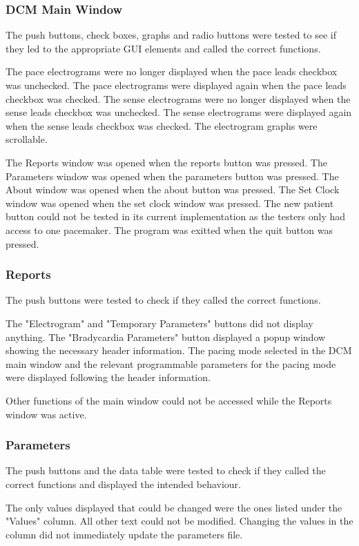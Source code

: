 \documentclass[12pt]{article}
\begin{document}
\subsubsection{DCM Main Window}\label{Testing:DCMMainWindow}
The push buttons, check boxes, graphs and radio buttons were tested to see if they led to the appropriate GUI elements and called the correct functions.

The pace electrograms were no longer displayed when the pace leads checkbox was unchecked. The pace electrograms were displayed again when the pace leads checkbox was checked. The sense electrograms were no longer displayed when the sense leads checkbox was unchecked. The sense electrograms were displayed again when the sense leads checkbox was checked. The electrogram graphs were scrollable.

The Reports window was opened when the reports button was pressed. The Parameters window was opened when the parameters button was pressed. The About window was opened when the about button was pressed. The Set Clock window was opened when the set clock window was pressed. The new patient button could not be tested in its current implementation as the testers only had access to one pacemaker. The program was exitted when the quit button was pressed.

\subsubsection{Reports}\label{Testing:Reports}
The push buttons were tested to check if they called the correct functions.

The "Electrogram" and "Temporary Parameters" buttons did not display anything. The "Bradycardia Parameters" button displayed a popup window showing the necessary header information. The pacing mode selected in the DCM main window and the relevant programmable parameters for the pacing mode were displayed following the header information. 

Other functions of the main window could not be accessed while the Reports window was active.

\subsubsection{Parameters}\label{Testing:Parameters}
The push buttons and the data table were tested to check if they called the correct functions and displayed the intended behaviour.

The only values displayed that could be changed were the ones listed under the "Values" column. All other text could not be modified. Changing the values in the column did not immediately update the parameters file. 
\end{document}
